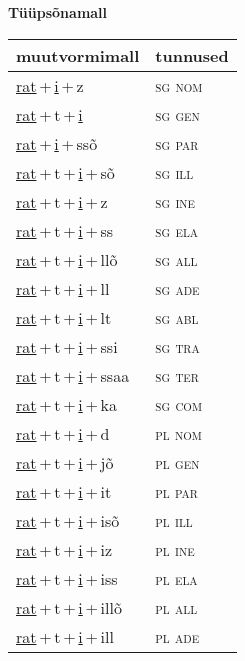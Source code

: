 
\vspace{1.8em}
\begin{minipage}{\textwidth}
\textbf{Tüüpsõnamall \,}\\

\begin{sideways}
\begin{tabular}{l l}
muutvormimall & tunnused \\
\hline
\underline{rat}\,+\,\underline{i}\,+\,z & \textsc{ sg nom } \\
\underline{rat}\,+\,t\,+\,\underline{i} & \textsc{ sg gen } \\
\underline{rat}\,+\,\underline{i}\,+\,ssõ & \textsc{ sg par } \\
\underline{rat}\,+\,t\,+\,\underline{i}\,+\,sõ & \textsc{ sg ill } \\
\underline{rat}\,+\,t\,+\,\underline{i}\,+\,z & \textsc{ sg ine } \\
\underline{rat}\,+\,t\,+\,\underline{i}\,+\,ss & \textsc{ sg ela } \\
\underline{rat}\,+\,t\,+\,\underline{i}\,+\,llõ & \textsc{ sg all } \\
\underline{rat}\,+\,t\,+\,\underline{i}\,+\,ll & \textsc{ sg ade } \\
\underline{rat}\,+\,t\,+\,\underline{i}\,+\,lt & \textsc{ sg abl } \\
\underline{rat}\,+\,t\,+\,\underline{i}\,+\,ssi & \textsc{ sg tra } \\
\underline{rat}\,+\,t\,+\,\underline{i}\,+\,ssaa & \textsc{ sg ter } \\
\underline{rat}\,+\,t\,+\,\underline{i}\,+\,ka & \textsc{ sg com } \\
\underline{rat}\,+\,t\,+\,\underline{i}\,+\,d & \textsc{ pl nom } \\
\underline{rat}\,+\,t\,+\,\underline{i}\,+\,jõ & \textsc{ pl gen } \\
\underline{rat}\,+\,t\,+\,\underline{i}\,+\,it & \textsc{ pl par } \\
\underline{rat}\,+\,t\,+\,\underline{i}\,+\,isõ & \textsc{ pl ill } \\
\underline{rat}\,+\,t\,+\,\underline{i}\,+\,iz & \textsc{ pl ine } \\
\underline{rat}\,+\,t\,+\,\underline{i}\,+\,iss & \textsc{ pl ela } \\
\underline{rat}\,+\,t\,+\,\underline{i}\,+\,illõ & \textsc{ pl all } \\
\underline{rat}\,+\,t\,+\,\underline{i}\,+\,ill & \textsc{ pl ade } \\

\end{tabular}
\end{sideways}
\end{minipage}
